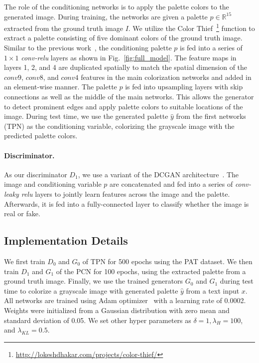 \documentclass[runningheads]{llncs}
\begin{document}
The role of the conditioning networks is to apply the palette colors to the generated image. During training, the networks are given a palette $p\in\mathbb{R}^{15}$ extracted from the ground truth image $I$. We utilize the Color Thief~\footnote{\url{http://lokeshdhakar.com/projects/color-thief/}} function to extract a palette consisting of five dominant colors of the ground truth image. Similar to the previous work~\cite{zhang2017real}, the conditioning palette $p$ is fed into a series of $1\times1$ \textit{conv-relu} layers as shown in Fig.~\ref{fig:full_model}. The feature maps in layers 1, 2, and 4 are duplicated spatially to match the spatial dimension of the $conv9$,
$conv8$, and $conv4$ features in the main colorization networks and added in an element-wise manner. The palette $p$ is fed into upsampling layers with skip connections as well as the middle of the main networks. This allows the generator to detect prominent edges and apply palette colors to suitable locations of the image. During test time, we use the generated palette $\hat{y}$ from the first networks (TPN) as the conditioning variable, colorizing the grayscale image with the predicted palette colors. 

\paragraph{Discriminator.}
As our discriminator $D_{1}$, we use a variant of the DCGAN architecture~\cite{radford2015unsupervised}. The image and conditioning variable $p$ are concatenated and fed into a series of \textit{conv-leaky relu} layers to jointly learn features across the image and the palette. Afterwards, it is fed into a fully-connected layer to classify whether the image is real or fake.

\subsection{Implementation Details}
We first train $D_{0}$ and $G_{0}$ of TPN for 500 epochs using the PAT dataset. We then train $D_{1}$ and $G_{1}$ of the PCN for 100 epochs, using the extracted palette from a ground truth image. Finally, we use the trained generators $G_{0}$ and $G_{1}$ during test time to colorize a grayscale image with generated palette $\hat{y}$ from a text input $x$. All networks are trained using Adam optimizer~\cite{kingma2014adam} with a learning rate of 0.0002. Weights were initialized from a Gaussian distribution with zero mean and standard deviation of 0.05. We set other hyper parameters as $\delta=1,\lambda_{H}=100$, and $\lambda_{KL}=0.5$.
\end{document}
